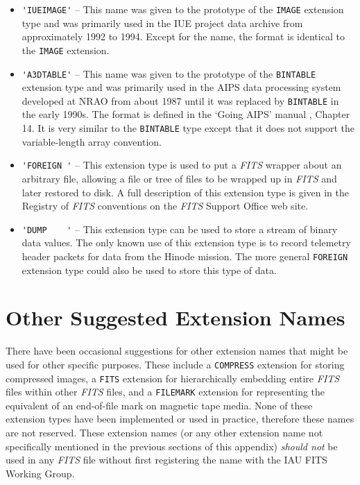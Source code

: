 \documentclass[11pt,makeidx]{book}     %
\begin{document}
\begin{itemize}
\item
\verb*+'IUEIMAGE'+ --  
This name was given to the prototype of the {\tt IMAGE} extension type and 
was primarily used in the IUE project data archive from approximately 1992 to 1994. 
Except for the name, the format is identical to the {\tt IMAGE} extension.

\item
\verb*+'A3DTABLE'+ --
This name was given to the prototype of the {\tt BINTABLE}
extension type and was primarily used in the AIPS data processing
system developed at NRAO from about 1987 until it was replaced by 
{\tt BINTABLE} in the early 1990s.  
The format is defined in the `Going AIPS' manual \cite{cotton90}, Chapter 14.
It  is very similar to the {\tt BINTABLE} type except that it does not support the
variable-length array convention.

\item
\verb*+'FOREIGN '+ --
 This extension type is used to put a {\em FITS\/} wrapper about an 
arbitrary file, allowing a file or tree of files to be wrapped up in {\em FITS\/} 
and later restored to disk.  A full description of this extension type
is given in the  Registry of {\em FITS\/} conventions on the {\em FITS\/} Support Office web site.

\item
\verb*+'DUMP    '+ -- 
This extension type  can be used to store a stream of binary data values. The only known use
of this extension type is to record telemetry header packets for data from the Hinode mission.
The more general {\tt FOREIGN} extension type could also be used to store this type of data.
\end{itemize}

\section{Other Suggested Extension Names}

There have been occasional suggestions for other extension names that might be used
for other specific purposes.  These include a {\tt COMPRESS} extension for storing
compressed images,  a {\tt FITS} extension for hierarchically embedding entire {\em FITS}
files within other {\em FITS} files, and a {\tt FILEMARK} extension for representing
the equivalent of an end-of-file mark on magnetic tape media.  None of these extension types
have been implemented or used in practice, therefore these names are not reserved.
These extension names (or any other extension name not specifically mentioned 
in the previous sections of this appendix) {\em should
not} be used in any {\em FITS\/} file without first registering the name with the IAU FITS Working Group.
\end{document}
